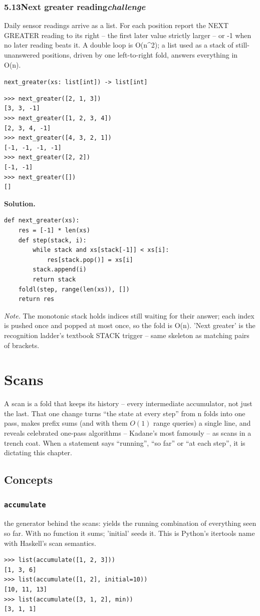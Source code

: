 \documentclass[10pt,letterpaper]{book}
\begin{document}
\subsection*{5.13\quad Next greater reading\hfill\textnormal{\textit{challenge}}}
Daily sensor readings arrive as a list. For each position report the NEXT GREATER reading to its right -- the first later value strictly larger -- or -1 when no later reading beats it. A double loop is O(n\^{}2); a list used as a stack of still-unanswered positions, driven by one left-to-right fold, answers everything in O(n).

\noindent\texttt{next\_greater(xs: list[int]) -> list[int]}
\begin{lstlisting}[style=ex]
>>> next_greater([2, 1, 3])
[3, 3, -1]
>>> next_greater([1, 2, 3, 4])
[2, 3, 4, -1]
>>> next_greater([4, 3, 2, 1])
[-1, -1, -1, -1]
>>> next_greater([2, 2])
[-1, -1]
>>> next_greater([])
[]
\end{lstlisting}
\noindent\textbf{Solution.}
\begin{lstlisting}[style=code]
def next_greater(xs):
    res = [-1] * len(xs)
    def step(stack, i):
        while stack and xs[stack[-1]] < xs[i]:
            res[stack.pop()] = xs[i]
        stack.append(i)
        return stack
    foldl(step, range(len(xs)), [])
    return res
\end{lstlisting}
\noindent\textit{Note.} The monotonic stack holds indices still waiting for their answer; each index is pushed once and popped at most once, so the fold is O(n). 'Next greater' is the recognition ladder's textbook STACK trigger -- same skeleton as matching pairs of brackets.

\clearpage
\chapter{Scans}

A scan is a fold that keeps its history -- every intermediate accumulator,
not just the last. That one change turns ``the state at every step'' from n
folds into one pass, makes prefix sums (and with them $O(1)$ range queries)
a single line, and reveals celebrated one-pass algorithms -- Kadane's most
famously -- as scans in a trench coat. When a statement says ``running'',
``so far'' or ``at each step'', it is dictating this chapter.
\section{Concepts}
\subsection{\texttt{accumulate}}\label{def:accumulate}
the generator behind the scans: yields the running combination of everything seen so far. With no function it sums; 'initial' seeds it. This is Python's itertools name with Haskell's scan semantics.
\begin{lstlisting}[style=ex]
>>> list(accumulate([1, 2, 3]))
[1, 3, 6]
>>> list(accumulate([1, 2], initial=10))
[10, 11, 13]
>>> list(accumulate([3, 1, 2], min))
[3, 1, 1]
\end{lstlisting}
\end{document}
